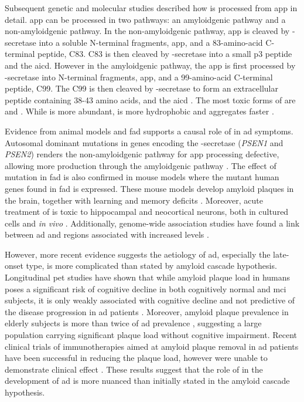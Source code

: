Subsequent genetic and molecular studies described how \abeta{} is processed from \gls{app} in detail. \Gls{app} can be processed in two pathways: an amyloidgenic pathway and a non-amyloidgenic pathway. In the non-amyloidgenic pathway, \gls{app} is cleaved by \textalpha-secretase into a soluble N-terminal fragments, \gls{app}\textalpha, and a 83-amino-acid C-terminal peptide, C83. C83 is then cleaved by \textgamma-secretase into a small p3 peptide and the \gls{aicd}. However in the amyloidgenic pathway, the \gls{app} is first processed by \textbeta-secretase into N-terminal fragments, \gls{app}\textbeta, and a 99-amino-acid C-terminal peptide, C99. The C99 is then cleaved by \textgamma-secretase to form an extracellular peptide containing 38-43 amino acids, \abeta{} and the \gls{aicd} \citep{barage15}. The most toxic forms of \abeta{} are \abeta[40] and \abeta[42]. While \abeta[40] is more abundant, \abeta[42] is more hydrophobic and aggregates faster \citep{walsh07}. 

Evidence from animal models and \gls{fad} supports a causal role of \abeta{} in \gls{ad} symptoms. Autosomal dominant mutations in genes encoding the \textgamma-secretase (\textit{PSEN1} and \textit{PSEN2}) renders the non-amyloidgenic pathway for \gls{app} processing defective, allowing more \abeta{} production through the amyloidgenic pathway \citep{suzuki94, levy-lahad95, rogaev95}. The effect of mutation in \gls{fad} is also confirmed in mouse models where the mutant human genes found in \gls{fad} is expressed. These mouse models develop amyloid plaques in the brain, together with learning and memory deficits \citep{hsiao96, dodart99, chishti01, westerman02}. Moreover, acute treatment of \abeta{} is toxic to hippocampal and neocortical neurons, both in cultured cells and \textit{in vivo} \citep{lacor04, shankar08}. Additionally, genome-wide association studies have found a link between \gls{ad} and regions associated with increased \abeta{} levels \citep{kehoe99, myers00}.

However, more recent evidence suggests the aetiology of \gls{ad}, especially the late-onset type, is more complicated than stated by amyloid cascade hypothesis. Longitudinal \gls{pet} studies have shown that while amyloid plaque load in humans poses a significant risk of cognitive decline in both cognitively normal and \gls{mci} subjects, it is only weakly associated with cognitive decline and not predictive of the disease progression in \gls{ad} patients \citep{chen14}. Moreover, amyloid plaque prevalence in elderly subjects is more than twice of \gls{ad} prevalence \citep{rowe10, ad16}, suggesting a large population carrying significant plaque load without cognitive impairment. Recent clinical trials of immunotherapies aimed at amyloid plaque removal in \gls{ad} patients have been successful in reducing the plaque load, however were unable to demonstrate clinical effect \citep{farlow15, siemers16, sevigny16}. These results suggest that the role of \abeta{} in the development of \gls{ad} is more nuanced than initially stated in the amyloid cascade hypothesis. 

